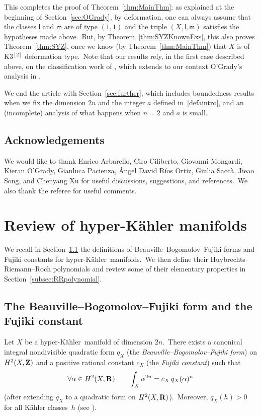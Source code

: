 \documentclass[12pt]{amsart}
\def\Z{{\bf Z}}
\def\R{{\bf R}}
\def\hk{hyper-K\"ahler}
\theoremstyle{remark}
\def\lll{\ensuremath{\mathsf l}}
\def\mm{\ensuremath{\mathsf m}}
\begin{document}
This completes the proof of Theorem~\ref{thm:MainThm}: as explained at the beginning of Section~\ref{sec:OGrady}, by deformation, one can always assume that the classes $\lll$ and $\mm$ are of type $(1,1)$ and the triple $(X,\lll,\mm)$ satisfies the hypotheses made above.\
But, by Theorem~\ref{thm:SYZKnownExs}, this also proves  Theorem~\ref{thm:SYZ}, once we know (by Theorem~\ref{thm:MainThm}) that $X$ is of  K3$^{[2]}$ deformation type.\ Note that our results rely, in the first case described above, on the classification work of \cite[Section 4]{voisinfib}, which extends to our context O'Grady's analysis in \cite{og1}.

We end the article with Section~\ref{sec:further}, which includes boundedness results when we fix the dimension $2n$ and the integer $a$ defined in~\eqref{defaintro}, and an (incomplete) analysis  of what happens when $n=2$ and $a$ is small.
 

\subsection*{Acknowledgements}
We would like to thank Enrico Arbarello, Ciro Ciliberto, Giovanni Mongardi, Kieran O'Grady, Gianluca Pacienza, \'Angel David R\'ios Ortiz, Giulia Sacc\`a, Jieao Song, and Chenyang Xu for useful discussions, suggestions, and references.\ We also thank the referee for useful comments.



\section{Review of hyper-K\"ahler manifolds}\label{sec:RRpolynomial}



We recall in Section~\ref{subsec:BBF} the definitions of  Beauville--Bogomolov--Fujiki forms and  Fujiki constants for \hk\ manifolds.\
We then define  their Huybrechts--Riemann--Roch polynomials  and   review some of their elementary properties   in Section~\ref{subsec:RRpolynomial}.

\subsection{The Beauville--Bogomolov--Fujiki form and the Fujiki constant}\label{subsec:BBF}

Let $X$ be a \hk\ manifold of dimension $2n$.\
There exists a canonical integral nondivisible quadratic form $q_X$ (the \emph{Beauville--Bogomolov--Fujiki form}) on $H^2(X,\Z)$ and a positive rational constant $c_X$ (the \emph{Fujiki constant}) such that
\begin{equation}\label{fuj}
\forall \alpha\in H^2(X,\R)\qquad \int_X \alpha^{2n}=c_X\, q_X(\alpha)^n
\end{equation}
(after extending $q_X$ to a quadratic form on $H^2(X,\R)$).\
Moreover, $q_X(h)>0$ for all K\"ahler  classes~$h$ (see \cite[Proposition~23.14]{huy}).
\end{document}

